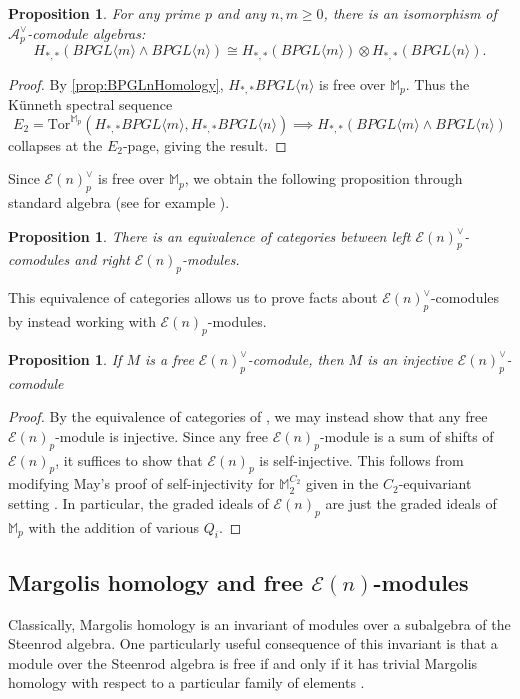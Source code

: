 \documentclass{amsart}
\newtheorem{proposition}[theorem]{Proposition}
\theoremstyle{plain}
\numberwithin{theorem}{section}
\numberwithin{equation}{section}
\numberwithin{figure}{section}
\newcommand{\mM}{{\mathbb M}}
\newcommand{\cE}{{\mathcal E}}
\newcommand{\0}{\langle 0 \rangle }
\begin{document}
\begin{proposition}
\label{prop:BPGLnKunneth}
    For any prime $p$ and any $n, m \geq 0$, there is an isomorphism of $\mathcal{A}_p^\vee$-comodule algebras:
    \[H_{*,*}(BPGL\langle m \rangle \wedge BPGL \langle n \rangle) \cong H_{*,*}(BPGL \langle m \rangle ) \otimes H_{*,*}(BPGL \langle n \rangle ). \]
\end{proposition}

\begin{proof}
    By \cref{prop:BPGLnHomology}, $H_{*,*}BPGL \langle n \rangle$ is free over $\mathbb{M}_p$. Thus the K\"unneth spectral sequence
    \[E_2 = \text{Tor}^{\mathbb{M}_p}(H_{*,*}BPGL \langle m \rangle, H_{*,*}BPGL \langle n \rangle) \implies H_{*,*}(BPGL \langle m \rangle \wedge BPGL \langle n \rangle)\]
    collapses at the $E_2$-page, giving the result.
\end{proof}

Since $\cE(n)^\vee_p$ is free over $\mM_p$, we obtain the following proposition through standard algebra (see for example \cite[Theorem 4.7]{BrzezinskiWisbauer03}).

\begin{proposition} \label{prop:EquivofCats}
    There is an equivalence of categories between left $\cE(n)_p^\vee$-comodules and right $\cE(n)_p$-modules.
\end{proposition}
This equivalence of categories allows us to prove facts about $\mathcal{E}(n)_p^\vee$-comodules by instead working with $\mathcal{E}(n)_p$-modules.
\begin{proposition}
\label{prop:freeImpliesInjective}
    If $M$ is a free $\cE(n)^\vee_p$-comodule, then $M$ is an injective $\cE(n)^\vee_p$-comodule
\end{proposition}

\begin{proof}
    By the equivalence of categories of , we may instead show that any free $\mathcal{E}(n)_p$-module is injective. Since any free $\mathcal{E}(n)_p$-module is a sum of shifts of $\mathcal{E}(n)_p$, it suffices to show that $\mathcal{E}(n)_p$ is self-injective. This follows from modifying May's proof of self-injectivity for $\mathbb{M}_2^{C_2}$ given in the $C_2$-equivariant setting \cite{Clover20}. In particular, the graded ideals of $\mathcal{E}(n)_p$ are just the graded ideals of $\mathbb{M}_p$ with the addition of various $Q_i$.
\end{proof}
\subsection{Margolis homology and free $\cE(n)$-modules}
Classically, Margolis homology is an invariant of modules over a subalgebra of the Steenrod algebra. One particularly useful consequence of this invariant is that a module over the Steenrod algebra is free if and only if it has trivial Margolis homology with respect to a particular family of elements \cite[Theorem 19.6]{Margolis83}. 
\end{document}
